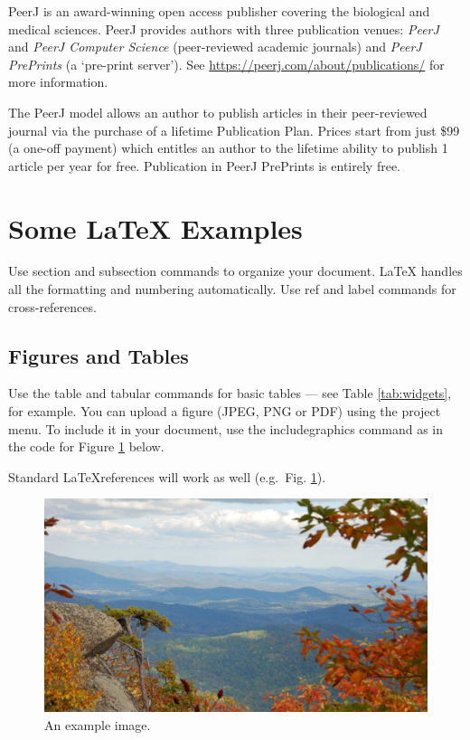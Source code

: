 \documentclass[fleqn,10pt,lineno]{wlpeerj} %
\theoremstyle{definition}
\theoremstyle{definition}
\theoremstyle{definition}
\theoremstyle{remark}
\begin{document}
PeerJ is an award-winning open access publisher covering the biological
and medical sciences. PeerJ provides authors with three publication
venues: \emph{PeerJ} and \emph{PeerJ Computer Science} (peer-reviewed
academic journals) and \emph{PeerJ PrePrints} (a `pre-print server').
See \url{https://peerj.com/about/publications/} for more information.

The PeerJ model allows an author to publish articles in their
peer-reviewed journal via the purchase of a lifetime Publication Plan.
Prices start from just \$99 (a one-off payment) which entitles an author
to the lifetime ability to publish 1 article per year for free.
Publication in PeerJ PrePrints is entirely free.

\section*{\texorpdfstring{Some \LaTeX{}
Examples}{Some  Examples}}\label{some-examples}

Use section and subsection commands to organize your document. \LaTeX{}
handles all the formatting and numbering automatically. Use ref and
label commands for cross-references.

\subsection*{Figures and Tables}\label{figures-and-tables}

Use the table and tabular commands for basic tables --- see Table
\ref{tab:widgets}, for example. You can upload a figure (JPEG, PNG or
PDF) using the project menu. To include it in your document, use the
includegraphics command as in the code for Figure \ref{fig:view} below.

Standard \LaTeX references will work as well (e.g.~Fig. \ref{fig:view}).

\begin{figure}
\includegraphics[width=1\linewidth]{view} \caption{An example image.}\label{fig:view}
\end{figure}
\end{document}
